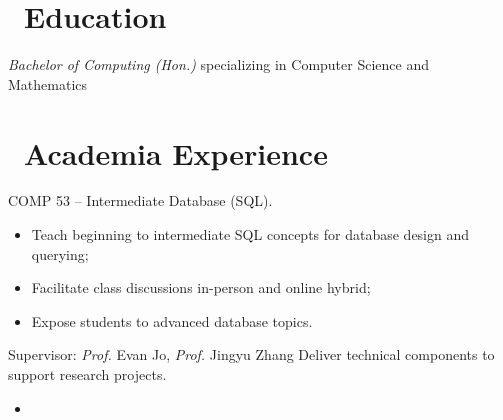 \documentclass{resume}
\begin{document}




\section{\faGraduationCap\ Education}
\textit{Bachelor of Computing (Hon.)} specializing in Computer Science and Mathematics


\section{\faUniversity\ Academia Experience}

 {}
COMP 53 -- Intermediate Database (SQL).
\begin{itemize}
  \item Teach beginning to intermediate SQL concepts for database design and querying;
  \item Facilitate class discussions in-person and online hybrid;
  \item Expose students to advanced database topics.
\end{itemize} 

 {Supervisor: \emph{Prof.} Evan Jo, \emph{Prof.} Jingyu Zhang }
Deliver technical components to support research projects.
\begin{itemize}
  \item 
\end{itemize}

 {}
\vspace{-.5em}
\end{document}
